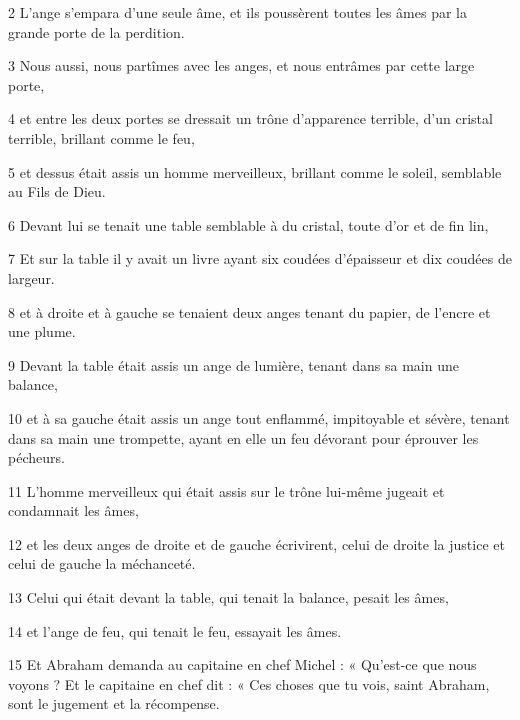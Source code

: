 \par 2 L'ange s'empara d'une seule âme, et ils poussèrent toutes les âmes par la grande porte de la perdition.

\par 3 Nous aussi, nous partîmes avec les anges, et nous entrâmes par cette large porte,

\par 4 et entre les deux portes se dressait un trône d'apparence terrible, d'un cristal terrible, brillant comme le feu,

\par 5 et dessus était assis un homme merveilleux, brillant comme le soleil, semblable au Fils de Dieu.

\par 6 Devant lui se tenait une table semblable à du cristal, toute d'or et de fin lin,

\par 7 Et sur la table il y avait un livre ayant six coudées d'épaisseur et dix coudées de largeur.

\par 8 et à droite et à gauche se tenaient deux anges tenant du papier, de l'encre et une plume.

\par 9 Devant la table était assis un ange de lumière, tenant dans sa main une balance,

\par 10 et à sa gauche était assis un ange tout enflammé, impitoyable et sévère, tenant dans sa main une trompette, ayant en elle un feu dévorant pour éprouver les pécheurs.

\par 11 L'homme merveilleux qui était assis sur le trône lui-même jugeait et condamnait les âmes,

\par 12 et les deux anges de droite et de gauche écrivirent, celui de droite la justice et celui de gauche la méchanceté.

\par 13 Celui qui était devant la table, qui tenait la balance, pesait les âmes,

\par 14 et l'ange de feu, qui tenait le feu, essayait les âmes.

\par 15 Et Abraham demanda au capitaine en chef Michel : « Qu'est-ce que nous voyons ? Et le capitaine en chef dit : « Ces choses que tu vois, saint Abraham, sont le jugement et la récompense.

